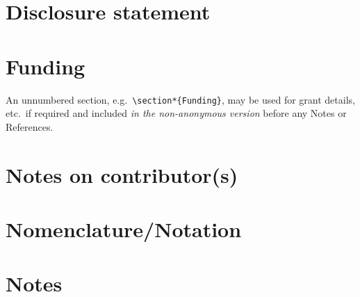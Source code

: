 \documentclass[]{interact}
\theoremstyle{plain}%
\theoremstyle{definition}
\theoremstyle{remark}
\begin{document}
\section*{Disclosure statement}\label{disclosure-statement}

\section*{Funding}\label{funding}

An unnumbered section,
e.g.~\texttt{\textbackslash{}section*\{Funding\}}, may be used for grant
details, etc.~if required and included \emph{in the non-anonymous
version} before any Notes or References.

\section*{Notes on contributor(s)}\label{notes-on-contributors}

\section*{Nomenclature/Notation}\label{nomenclaturenotation}

\section*{Notes}\label{notes}






\end{document}
